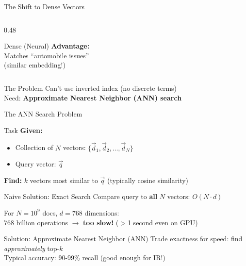 \documentclass[aspectratio=169]{beamer}
\newif\ifanimated
\newcommand{\cpause}{\ifanimated\pause\fi}
\begin{document}
\begin{frame}[shrink=10]{The Shift to Dense Vectors}
\begin{columns}
\begin{column}{0.48\textwidth}
\begin{block}{Dense (Neural)}
\textbf{Advantage:} \\
Matches ``automobile issues'' \\
(similar embedding!)
\end{block}
\cpause
\end{column}
\end{columns}

\vspace{1em}

\begin{alertblock}{The Problem}
Can't use inverted index (no discrete terms) \\
Need: \textbf{Approximate Nearest Neighbor (ANN) search}
\end{alertblock}
\cpause
\end{frame}

\begin{frame}[shrink=15]{The ANN Search Problem}
\begin{block}{Task}
\textbf{Given:}
\begin{itemize}
    \item Collection of $N$ vectors: $\{\vec{d}_1, \vec{d}_2, \ldots, \vec{d}_N\}$
    \item Query vector: $\vec{q}$
\end{itemize}

\textbf{Find:} $k$ vectors most similar to $\vec{q}$ (typically cosine similarity)
\end{block}
\cpause

\vspace{1em}

\begin{alertblock}{Naive Solution: Exact Search}
Compare query to \textbf{all} $N$ vectors: $O(N \cdot d)$

\vspace{0.5em}

For $N = 10^9$ docs, $d = 768$ dimensions: \\
768 billion operations $\rightarrow$ \textbf{too slow!} ($>$1 second even on GPU)
\end{alertblock}
\cpause

\vspace{1em}

\begin{exampleblock}{Solution: Approximate Nearest Neighbor (ANN)}
Trade exactness for speed: find \textit{approximately} top-$k$ \\
Typical accuracy: 90-99\% recall (good enough for IR!)
\end{exampleblock}
\cpause
\end{frame}
\end{document}
